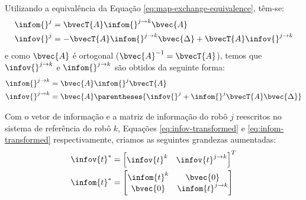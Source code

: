 Utilizando a equivalência da Equação \ref{eq:map-exchange-equivalence}, 
têm-se:
\begin{align}
  \infom{}^j &= \bvecT{A} \infom{}^{j\to k} \bvec{A}\\
  \infov{}^j &= -\bvecT{A}\infom{}^{j\to k}\bvec{\Delta} + \bvecT{A}\infov{}^{j\to k}
\end{align}
e como $\bvec{A}$ é ortogonal ($\bvec{A}^{-1} = \bvecT{A}$), temos que 
$\infov{}^{j\to k}$ e $\infom{}^{j\to k}$ são obtidos da seguinte forma:
\begin{align}
  \infom{}^{j\to k} &= \bvec{A}\infom{}^j \bvecT{A}
  \label{eq:infom-transformed}\\
  \infov{}^{j\to k} &= \bvec{A} \parentheses{\infov{}^j +  
  \infom{}^j\bvecT{A}\bvec{\Delta}}
  \label{eq:infov-transformed}
\end{align}

Com o vetor de informação e a matriz de informação do 
robô $j$ reescritos no sistema de referência do robô $k$, Equações \ref{eq:infov-transformed} e \ref{eq:infom-transformed} respectivamente, criamos as seguintes grandezas aumentadas:
\begin{align}
  \infov{t}^* &= \begin{bmatrix}
    \infov{t}^k & \infov{t}^{j\to k}
  \end{bmatrix}^T\\
  \infom{t}^* &= \begin{bmatrix}
    \infom{t}^k & \bvec{0}\\
    \bvec{0} & \infom{t}^{j\to k}
  \end{bmatrix} 
\end{align}

